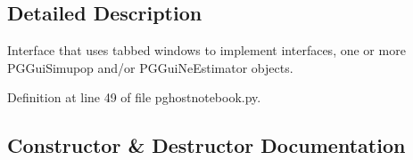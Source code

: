 \subsection{Detailed Description}
\begin{DoxyVerb}Interface that uses tabbed windows to implement interfaces, one or more PGGuiSimupop and/or PGGuiNeEstimator
objects.
\end{DoxyVerb}
 

Definition at line 49 of file pghostnotebook.\+py.



\subsection{Constructor \& Destructor Documentation}
